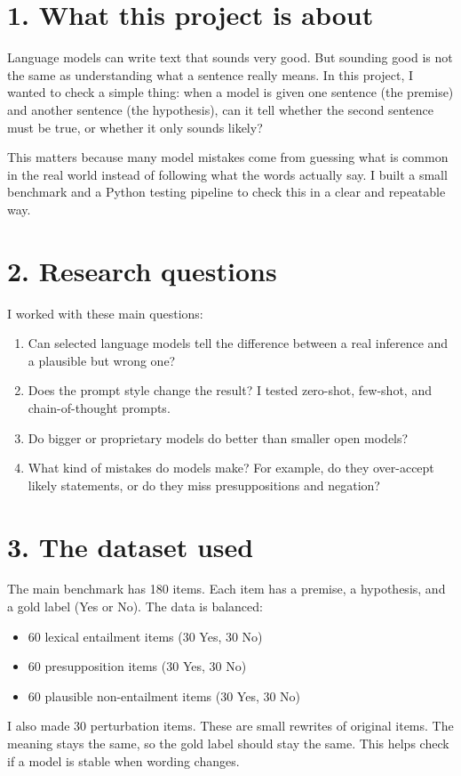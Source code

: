 \documentclass[11pt, a4paper]{article}
\begin{document}
\vspace{0.6em}
\noindent{\color{rulegray}\rule{\textwidth}{0.6pt}}

\FloatBarrier
{}
\section*{\color{bambergnavy} 1. What this project is about}
Language models can write text that sounds very good. But sounding good is not the same as understanding what a sentence really means. In this project, I wanted to check a simple thing: when a model is given one sentence (the premise) and another sentence (the hypothesis), can it tell whether the second sentence must be true, or whether it only sounds likely?

This matters because many model mistakes come from guessing what is common in the real world instead of following what the words actually say. I built a small benchmark and a Python testing pipeline to check this in a clear and repeatable way.

\FloatBarrier
{}
\section*{\color{bambergnavy} 2. Research questions}
I worked with these main questions:
\begin{enumerate}[leftmargin=*]
    \item Can selected language models tell the difference between a real inference and a plausible but wrong one?
    \item Does the prompt style change the result? I tested zero-shot, few-shot, and chain-of-thought prompts.
    \item Do bigger or proprietary models do better than smaller open models?
    \item What kind of mistakes do models make? For example, do they over-accept likely statements, or do they miss presuppositions and negation?
\end{enumerate}

\FloatBarrier
{}
\section*{\color{bambergnavy} 3. The dataset used}
The main benchmark has 180 items. Each item has a premise, a hypothesis, and a gold label (Yes or No). The data is balanced:
\begin{itemize}[leftmargin=*]
    \item 60 lexical entailment items (30 Yes, 30 No)
    \item 60 presupposition items (30 Yes, 30 No)
    \item 60 plausible non-entailment items (30 Yes, 30 No)
\end{itemize}
I also made 30 perturbation items. These are small rewrites of original items. The meaning stays the same, so the gold label should stay the same. This helps check if a model is stable when wording changes.
\end{document}
